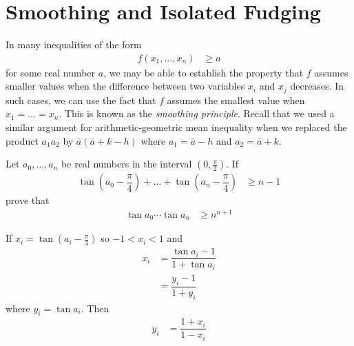 \documentclass[inequalities.tex]{subfile}
\begin{document}
	\section{Smoothing and Isolated Fudging}\label{sec:smoothfudging}
	In many inequalities of the form
		\begin{align*}
			f(x_{1},\ldots,x_{n})
				& \geq a
		\end{align*}
	for some real number $a$, we may be able to establish the property that $f$ assumes smaller values when the difference between two variables $x_{i}$ and $x_{j}$ decreases. In such cases, we can use the fact that $f$ assumes the smallest value when $x_{1}=\ldots=x_{n}$. This is known as the \textit{smoothing principle}. Recall that we used a similar argument for arithmetic-geometric mean inequality when we replaced the product $a_{1}a_{2}$ by $\bar{a}(\bar{a}+k-h)$ where $a_{1}=\bar{a}-h$ and $a_{2}=\bar{a}+k$.
		\begin{problem}[USA $1996$]\label{prob:usa1996-3}
			Let $a_{0},\ldots,a_{n}$ be real numbers in the interval $\left(0,\frac{\pi}{2}\right)$. If
				\begin{align*}
					\tan\left(a_{0}-\dfrac{\pi}{4}\right)+\ldots+\tan\left(a_{n}-\dfrac{\pi}{4}\right)
						& \geq n-1
				\end{align*}
			prove that
				\begin{align*}
					\tan{a_{0}}\cdots\tan{a_{n}}
						& \geq n^{n+1}
				\end{align*}

				\begin{solution}
					If $x_{i}=\tan\left(a_{i}-\frac{\pi}{4}\right)$ so $-1<x_{i}<1$ and
						\begin{align*}
							x_{i}
								& = \dfrac{\tan{a_{i}}-1}{1+\tan{a_{i}}}\\
								& = \dfrac{y_{i}-1}{1+y_{i}}
						\end{align*}
					where $y_{i}=\tan{a_{i}}$. Then
						\begin{align*}
							y_{i}
								& = \dfrac{1+x_{i}}{1-x_{i}}
						\end{align*}
				\end{solution}
		\end{problem}
\end{document}
